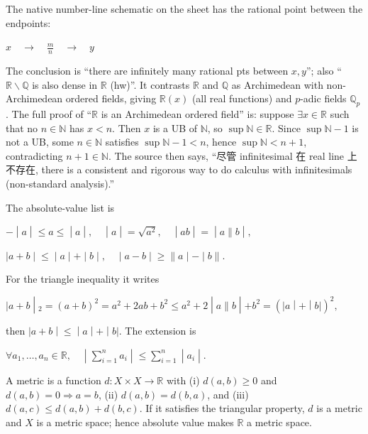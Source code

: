 The native number-line schematic on the sheet has the rational point between the endpoints:

\(x\quad\longrightarrow\quad\frac{m}{n}\quad\longrightarrow\quad y\)

The conclusion is ``there are infinitely many rational pts between \(x,y\)''; also ``\(\mathbb{R} \smallsetminus \mathbb{Q}\) is also dense in \(\mathbb{R}\) (hw)''. It contrasts \(\mathbb{R}\) and \(\mathbb{Q}\) as Archimedean with non-Archimedean ordered fields, giving \(\mathbb{R}(x)\) (all real functions) and \(p\)-adic fields \(\mathbb{Q}_{p}\). The full proof of ``\(\mathbb{R}\) is an Archimedean ordered field'' is: suppose \(\exists x \in \mathbb{R}\) such that no \(n \in \mathbb{N}\) has \(x < n\). Then \(x\) is a UB of \(\mathbb{N}\), so \(\sup\mathbb{N} \in \mathbb{R}\). Since \(\sup\mathbb{N} - 1\) is not a UB, some \(n \in \mathbb{N}\) satisfies \(\sup\mathbb{N} - 1 < n\), hence \(\sup\mathbb{N} < n + 1\), contradicting \(n + 1 \in \mathbb{N}\). The source then says, ``尽管 infinitesimal 在 real line 上不存在, there is a consistent and rigorous way to do calculus with infinitesimals (non-standard analysis).''

The absolute-value list is

\(\left. - \middle| a \middle| \leq a \leq \middle| a \middle| ,\quad \middle| a \middle| = \sqrt{a^{2}},\quad \middle| ab \middle| = \middle| a\| b \middle| , \right.\)

\(\left. |a + b \middle| \leq \middle| a \middle| + \middle| b \middle| ,\quad \middle| a - b \middle| \geq \| a \middle| - \middle| b\|. \right.\)

For the triangle inequality it writes

\(\left. |a + b \middle| {}_{2} = \left( {a + b} \right)^{2} = a^{2} + 2ab + b^{2} \leq a^{2} + 2 \middle| a\| b \middle| + b^{2} = \left( |a \middle| + \middle| b| \right)^{2}, \right.\)

then \(\left. |a + b \middle| \leq \middle| a \middle| + \middle| b| \right.\). The extension is

\(\left. \forall a_{1},\ldots,a_{n} \in \mathbb{R},\quad \middle| \sum_{i = 1}^{n}a_{i} \middle| \leq \sum_{i = 1}^{n} \middle| a_{i} \middle| . \right.\)

A metric is a function \(d:X \times X\rightarrow\mathbb{R}\) with (i) \(d\left( {a,b} \right) \geq 0\) and \(d\left( {a,b} \right) = 0\Rightarrow a = b\), (ii) \(d\left( {a,b} \right) = d\left( {b,a} \right)\), and (iii) \(d\left( {a,c} \right) \leq d\left( {a,b} \right) + d\left( {b,c} \right)\). If it satisfies the triangular property, \(d\) is a metric and \(X\) is a metric space; hence absolute value makes \(\mathbb{R}\) a metric space.

